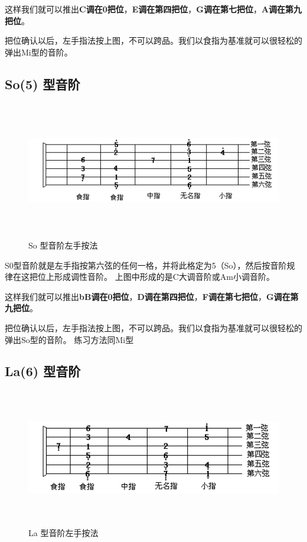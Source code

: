 \documentclass[UTF8,a4paper,12pt]{ctexbook}
\begin{document}
			这样我们就可以推出\textbf{C调在0把位}，\textbf{E调在第四把位}，\textbf{G调在第七把位}，\textbf{A调在第九把位}。
			
			把位确认以后，左手指法按上图，不可以跨品。我们以食指为基准就可以很轻松的弹出Mi型的音阶。	
			
			
		\subsection{So(5) 型音阶}		
			\begin{figure}[H]
				\centering
				\includegraphics[width=15cm,height=6cm]{so}
				\caption{So 型音阶左手按法}
			\end{figure}	
			
			S0型音阶就是左手指按第六弦的任何一格，并将此格定为5（So），然后按音阶规律在这把位上形成调性音阶。
			上图中形成的是C大调音阶或Am小调音阶。
			
			
			这样我们就可以推出\textbf{bB调在0把位}，\textbf{D调在第四把位}，\textbf{F调在第七把位}，\textbf{G调在第九把位}。
			
			把位确认以后，左手指法按上图，不可以跨品。我们以食指为基准就可以很轻松的弹出So型的音阶。
			练习方法同Mi型					

		
		
		\subsection{La(6) 型音阶}
			\begin{figure}[H]
				\centering
				\includegraphics[width=15cm,height=6cm]{la}
				\caption{La 型音阶左手按法}
			\end{figure}	
					
\end{document}
